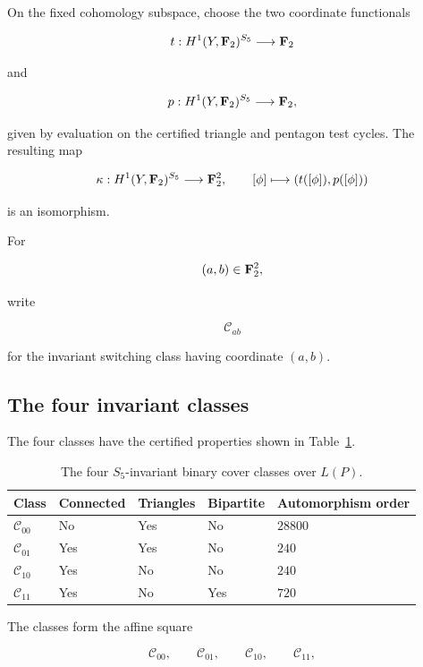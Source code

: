 On the fixed cohomology subspace, choose the two coordinate functionals

\[
t:
H^1(Y,\mathbf F_2)^{S_5}
\longrightarrow
\mathbf F_2
\]

and

\[
p:
H^1(Y,\mathbf F_2)^{S_5}
\longrightarrow
\mathbf F_2,
\]

given by evaluation on the certified triangle and pentagon test cycles.
The resulting map

\[
\kappa:
H^1(Y,\mathbf F_2)^{S_5}
\longrightarrow
\mathbf F_2^2,
\qquad
[\phi]\longmapsto(t([\phi]),p([\phi]))
\]

is an isomorphism.

For

\[
(a,b)\in\mathbf F_2^2,
\]

write

\[
\mathcal C_{ab}
\]

for the invariant switching class having coordinate \((a,b)\).

\subsection{The four invariant classes}


The four classes have the certified properties shown in
Table~\ref{tab:invariant-cover-square}.

\begin{table}[h]
\centering
\begin{tabular}{lllll}
\toprule
Class &
Connected &
Triangles &
Bipartite &
Automorphism order\\
\midrule
\(\mathcal C_{00}\) & No  & Yes & No  & \(28800\)\\
\(\mathcal C_{01}\) & Yes & Yes & No  & \(240\)\\
\(\mathcal C_{10}\) & Yes & No  & No  & \(240\)\\
\(\mathcal C_{11}\) & Yes & No  & Yes & \(720\)\\
\bottomrule
\end{tabular}
\caption{The four \(S_5\)-invariant binary cover classes over
\(L(P)\).}
\label{tab:invariant-cover-square}
\end{table}

The classes form the affine square

\[
\mathcal C_{00},
\qquad
\mathcal C_{01},
\qquad
\mathcal C_{10},
\qquad
\mathcal C_{11},
\]

